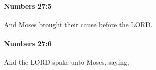 		\paragraph{Numbers 27:5} %
			\label{NUMBERS-27-5}

			And Moses brought their cause before the LORD.


		\paragraph{Numbers 27:6} %
			\label{NUMBERS-27-6}

			And the LORD spake unto Moses, saying,


